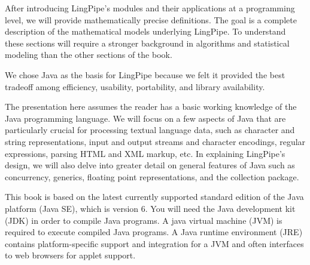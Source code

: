 After introducing LingPipe's modules and their applications at a
programming level, we will provide mathematically precise definitions.
The goal is a complete description of the mathematical models
underlying LingPipe.  To understand these sections will require a
stronger background in algorithms and statistical modeling than
the other sections of the book.
        



\noindent
We chose Java as the basis for LingPipe because we felt it provided
the best tradeoff among efficiency, usability, portability, and
library availability.

The presentation here assumes the reader has a basic working knowledge
of the Java programming language.  We will focus on a few aspects of
Java that are particularly crucial for processing textual language
data, such as character and string representations, input and output
streams and character encodings, regular expressions, parsing HTML and
XML markup, etc.  In explaining LingPipe's design, we will also delve
into greater detail on general features of Java such as concurrency,
generics, floating point representations, and the collection package.


\noindent
This book is based on the latest currently supported standard edition
of the Java platform (Java SE), which is version 6.  You will need the
Java development kit (JDK) in order to compile Java programs.  A java
virtual machine (JVM) is required to execute compiled Java programs.
A Java runtime environment (JRE) contains platform-specific support
and integration for a JVM and often interfaces to web browsers for
applet support.




